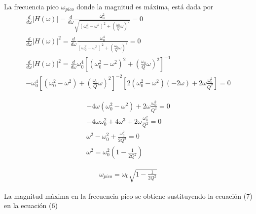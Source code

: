 \documentclass[12pt,a4paper]{article}
\begin{document}
	La frecuencia pico $\omega_{pico}$ donde la magnitud es máxima, está dada por
	\begin{align}
		\frac{d}{d\omega}|H(\omega)| = \frac{d}{d\omega} \frac{\omega_0^{2}}{\sqrt{(\omega_0^{2} - \omega^{2})^{2} + (\frac{\omega_0}{Q}\omega)^{2} }} = 0\nonumber\\
		\frac{d}{d\omega}|H(\omega)|^{2} = \frac{d}{d\omega}\frac{\omega_0^{4}}{(\omega_0^{2} - \omega^{2})^{2} + (\frac{\omega_0}{Q}\omega)^{2}} = 0\nonumber\\
		\frac{d}{d\omega}|H(\omega)|^{2} = \frac{d}{d\omega}\omega_0^{4}\left[ \left(\omega_0^{2} - \omega^{2}\right)^{2} + \left(\frac{\omega_0}{Q}\omega\right)^{2} \right]^{-1}\nonumber\\
		-\omega_0^{4}\left[ (\omega_0^{2} - \omega^{2}) + \left( \frac{\omega_0}{Q}\omega \right)^{2} \right]^{-2} \left[ 2(\omega_0^{2} - \omega^{2})(-2\omega) + 2\omega\frac{\omega_0^{2}}{Q^2} \right] = 0\nonumber	
	\end{align}
	
	\vspace{-0.5cm}

	\begin{align}
		-4\omega(\omega_0^{2} - \omega^{2}) + 2\omega\frac{\omega_0^{2}}{Q^2} = 0\nonumber\\
		-4\omega\omega_0^{2} + 4\omega^{3} + 2\omega\frac{\omega_0^{2}}{Q^2} = 0\nonumber\\
		\omega^{2} - \omega_0^{2} + \frac{\omega_0^{2}}{2Q^2} = 0\nonumber\\
		\omega^{2} = \omega_0^{2}\left( 1 - \frac{1}{2Q^{2}} \right)\nonumber
	\end{align}

	\begin{tcolorbox}[colback=red!5!white,colframe=red!75!black,width=(\linewidth+0.45cm)]
		\begin{align}
			\omega_{pico} = \omega_0 \sqrt{1 - \frac{1}{2Q^2}}
		\end{align}	
	\end{tcolorbox}
	
	La magnitud máxima en la frecuencia pico se obtiene sustituyendo la ecuación (7) en la ecuación (6)
		
\end{document}
